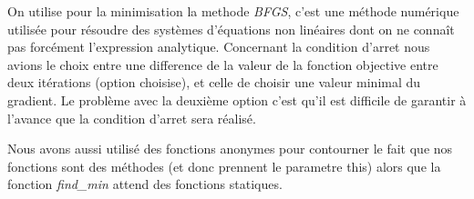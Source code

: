 On utilise pour la minimisation la methode \textit{BFGS}, c'est une méthode numérique utilisée pour résoudre des systèmes d'équations non linéaires dont on ne connaît pas forcément l'expression analytique.
Concernant la condition d'arret nous avions le choix entre une difference de la valeur de la fonction objective entre deux itérations (option choisise), et celle de choisir une valeur minimal du gradient. Le problème avec la deuxième option c'est qu'il est difficile de garantir à l'avance que la condition d'arret sera réalisé.

Nous avons aussi utilisé des fonctions anonymes pour contourner le fait que nos fonctions sont des méthodes (et donc prennent le parametre this) alors que la fonction \textit{find\_min} attend des fonctions statiques.
